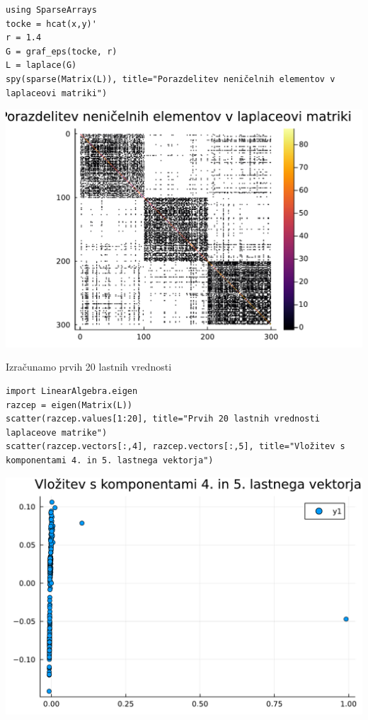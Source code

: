\documentclass[12pt,a4paper]{article}
\begin{document}
\begin{verbatim}
using SparseArrays
tocke = hcat(x,y)'
r = 1.4
G = graf_eps(tocke, r)
L = laplace(G)
spy(sparse(Matrix(L)), title="Porazdelitev neničelnih elementov v laplaceovi matriki")
\end{verbatim}
\includegraphics[width=\linewidth]{jl_Y5bBlk/demo_3_1.pdf}

Izračunamo prvih 20 lastnih vrednosti


\begin{verbatim}
import LinearAlgebra.eigen
razcep = eigen(Matrix(L))
scatter(razcep.values[1:20], title="Prvih 20 lastnih vrednosti laplaceove matrike")
scatter(razcep.vectors[:,4], razcep.vectors[:,5], title="Vložitev s komponentami 4. in 5. lastnega vektorja")
\end{verbatim}
\includegraphics[width=\linewidth]{jl_Y5bBlk/demo_4_1.pdf}
\end{document}
